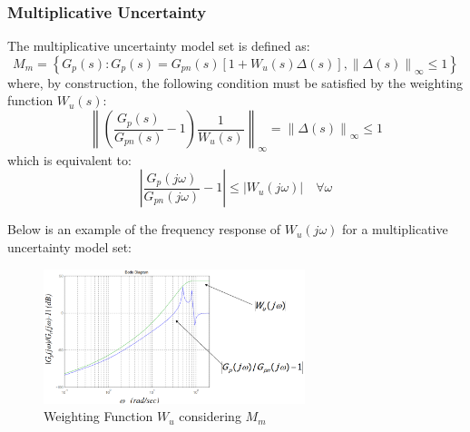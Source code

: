 \documentclass[a4paper,10pt,titlepage]{article}
\numberwithin{equation}{subsection}
\begin{document}
	\raggedright
	\subsubsection{Multiplicative Uncertainty}
	The multiplicative uncertainty model set is defined as:
	\begin{equation}
		M_m = \left\{ G_p(s): G_p(s)=G_{pn}(s) \left[1+W_u(s)\Delta(s)\right], \left\lVert\Delta(s)\right\rVert_\infty \leq1 \right\}
	\end{equation}
	where, by construction, the following condition must be satisfied by the weighting function $W_u(s)$:
	\begin{equation}
		\left\lVert \left( \dfrac{G_p(s)}{G_{pn}(s)}-1 \right) \dfrac{1}{W_u(s)}\right\rVert_\infty = \left\lVert \Delta(s) \right\rVert_\infty \leq 1
	\end{equation}
	which is equivalent to:
	\begin{equation}
		\left| \dfrac{G_p(j\omega)}{G_{pn}(j\omega)}-1 \right| \leq \left| W_u(j\omega) \right| \quad \forall \omega
	\end{equation}
	
	Below is an example of the frequency response of $W_u(j\omega)$ for a multiplicative uncertainty model set:
	
	\begin{figure}[H] %
		\centering
		\includegraphics[width=0.68\textwidth]{images/multiplicative_uncertainty.png}
		\caption{Weighting Function $W_u$ considering $M_m$}
		\label{fig:image7}
	\end{figure}
	
\end{document}
